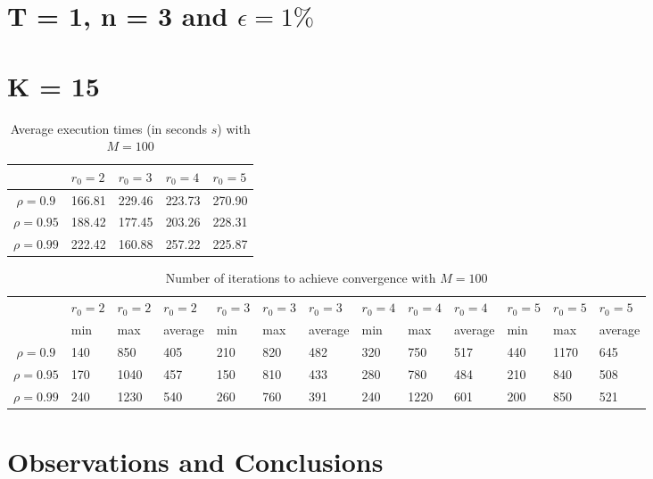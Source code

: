 \documentclass[a4paper,11pt,openright]{report}
\begin{document}
\section{T = 1, n = 3 and $\epsilon = 1\%$}
\section*{K = 15}
\begin{table}[H]
\centering
\addtolength{\leftskip}{-1.5cm}
\addtolength{\rightskip}{-1.5cm}
\begin{tabular}{|c|llll|}
\hline
$ $ & $r_0 = 2$ & $r_0 = 3$ & $r_0 = 4$ & $r_0 = 5$ \\
\hline
$\rho = 0.9$ & 166.81 & 229.46 & 223.73 & 270.90\\
$\rho = 0.95$ & 188.42 & 177.45 & 203.26 & 228.31\\
$\rho = 0.99$ & 222.42 & 160.88 & 257.22 & 225.87\\
\hline
\end{tabular}
\caption{Average execution times (in seconds $s$) with $M = 100$}
\end{table}
\begin{table}[H]
\centering
\addtolength{\leftskip}{-3.7cm}
\addtolength{\rightskip}{-3.7cm}
\begin{tabular}{|c|llllllllllll|}
\hline
$ $ & $r_0 = 2$ & $r_0 = 2$ & $r_0 = 2$ & $r_0 = 3$ & $r_0 = 3$ & $r_0 = 3$ & $r_0 = 4$ & $r_0 = 4$ & $r_0 = 4$ & $r_0 = 5$ & $r_0 = 5$ & $r_0 = 5$ \\
$ $ & min & max & average & min & max & average & min & max & average & min & max & average \\
\hline
$\rho = 0.9$ & 140 & 850 & 405 & 210 & 820 & 482 & 320 & 750 & 517 & 440 &1170 & 645 \\
$\rho = 0.95$ & 170 & 1040 & 457 & 150 & 810 & 433 & 280 & 780 & 484 & 210 & 840 & 508   \\
$\rho = 0.99$ & 240 & 1230 & 540 & 260 & 760 & 391 & 240 & 1220 & 601 & 200 & 850 & 521\\
\hline
\end{tabular}
\caption{Number of iterations to achieve convergence with $M = 100$}
\end{table}










\section{Observations and Conclusions}
\end{document}
